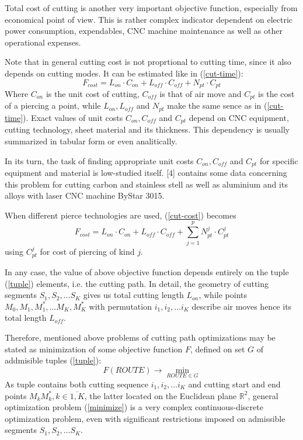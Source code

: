 \documentclass{../download/tPRS2e}
\begin{document}
Total cost of cutting is another very important
objective function,
especially from economical point of view.
This is rather complex indicator dependent on
electric power consumption,
expendables,
CNC machine maintenance
as well as other operational expenses.

Note that in general cutting cost is not 
proprtional to cutting time,
since it also depends on cutting modes.
It can be estimated like in (\ref{cut-time}):
\begin{equation}
    F_{cost} = L_{on}\cdot C_{on} + L_{off}\cdot C_{off} + N_{pt} \cdot C_{pt}
    \label{cut-cost}
\end{equation}
Where
$C_{on}$ is the unit cost of cutting,
$C_{off}$ is that of air move and
$C_{pt}$ is the cost of a piercing a point,
while $L_{on}, L_{off}$ and $N_{pt}$
make the same sence as in (\ref{cut-time}).
Exact values of unit costs
$C_{on}, C_{off}$ and $C_{pt}$
depend on CNC equipment, cutting technology,
sheet material and its thickness.
This dependency is usually summarized
in tabular form or even analitically.

In its turn,
the task of finding appropriate unit costs
$C_{on}, C_{off}$ and $C_{pt}$
for specific equipment and material 
is  low-studied itself.
[4] contains some data concerning this problem
for cutting carbon and stainless stell
as well as aluminium and its alloys
with laser CNC machine ByStar 3015.

When different pierce technologies are used,
(\ref{cut-cost}) becomes
\begin{equation}
    F_{cost} = L_{on}\cdot C_{on} + L_{off}\cdot C_{off}
    + \sum_{j=1}^p N_{pt}^j \cdot C_{pt}^j
    \label{piercings-cost}
\end{equation}
using $C_{pt}^j$ for
cost of piercing of kind $j$.

In any case,
the value of above objective function
depends entirely on the tuple (\ref{tuple})
elements,
i.e. the cutting path.
In detail,
the geometry of cutting segments
$S_1, S_2, \dots S_K$ gives us
total cutting length $L_{on}$,
while points $M_0, M_1, M_1^*, \dots M_K, M_K^*$
with permutation $i_1, i_2, \dots i_K$
describe air moves hence its total length $L_{off}$.

Therefore,
mentioned above problems
of cutting path optimizations may be
stated as minimization of some objective function $F$,
defined on set $G$ of addmisible tuples (\ref{tuple}):
\begin{equation}
    F(ROUTE) \to \min_{ROUTE \in G}
    \label{minimize}
\end{equation}
As tuple contains both
cutting sequence 
$i_1, i_2, \dots i_K$
and cutting start and end points 
$M_kM_k^*, k \in \overline{1, K}$,
the latter located on the Euclidean plane $\mathbb R^2$,
general optimization problem (\ref{minimize})
is a very complex 
continuous-discrete optimization problem,
even with significant restrictions imposed
on admissible segments
$S_1, S_2, \dots S_K$.
\end{document}
